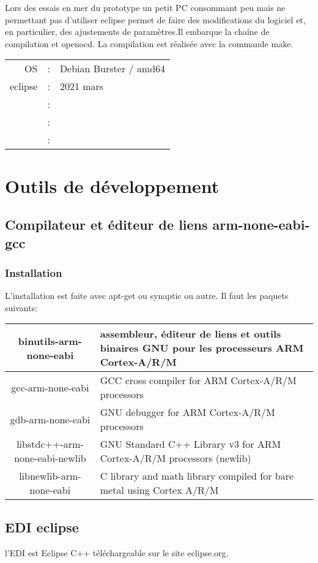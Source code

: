 \documentclass[a4paper,11pt]{report}
\begin{document}
Lors des essais en mer du prototype un petit PC consommant peu
mais ne permettant pas d'utiliser eclipse permet de faire des
modifications du logiciel et, en particulier, des ajustements
de paramètres.Il embarque la chaîne de compilation et openocd.
La compilation est réalisée avec la commande make.

\begin{tabular}{|rcl|}
	\hline 
	&  &  \\ 
	\hline 
	OS & : & Debian Burster / amd64 \\ 
	eclipse& : & 2021 mars \\ 
	& : &  \\ 
	& : &  \\ 
	& : &  \\ 
	\hline 
\end{tabular} 

\chapter{Outils de développement}
\section{Compilateur et éditeur de liens arm-none-eabi-gcc}
\subsection{Installation}
L'installation est faite avec apt-get ou synaptic ou autre. Il faut les paquets suivants: 

\begin{tabular}{|c|p{6cm}|}
	\hline 
    binutils-arm-none-eabi & assembleur, éditeur de liens et outils binaires GNU pour les processeurs ARM Cortex-A/R/M\\
    \hline
    gcc-arm-none-eabi & GCC cross compiler for ARM Cortex-A/R/M processors\\
    \hline
    gdb-arm-none-eabi & GNU debugger for ARM Cortex-A/R/M processors\\
    \hline
    libstdc++-arm-none-eabi-newlib & GNU Standard C++ Library v3 for ARM Cortex-A/R/M processors (newlib)\\
    \hline
    libnewlib-arm-none-eabi & C library and math library compiled for bare metal using Cortex A/R/M\\
	\hline 
\end{tabular} 

\section{EDI eclipse}
l'EDI est Eclipse C++ téléchargeable sur le site eclipse.org.
\end{document}
